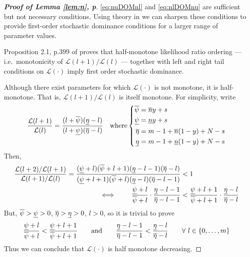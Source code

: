 \documentclass[12pt, a4paper]{elsarticle}
\begin{document}
\begin{proof}[\textbf{Proof of Lemma \ref{lem:n}, p\pageref{lem:n}}]
  \label{prf:n2}
  \eqref{eq:nuDOMnl} and \eqref{eq:nlDOMnu}
  are sufficient but not necessary conditions.  Using theory in 
  \cite{klenke2010} we can sharpen these conditions to provide
  first-order stochastic dominance conditions for a larger range of
  parameter values.
  
  Proposition 2.1, p.399 of \cite{klenke2010} proves that half-monotone
  likelihood ratio ordering --- i.e.\ monotonicity of $\mathcal{L}(l+1) / \mathcal{L}(l)$ ---
  together with left and right tail conditions on $\mathcal{L}(\cdot)$
  imply first order stochastic dominance.
  
  \medskip
  
  Although there exist parameters for which $\mathcal{L}(\cdot)$ is
  not monotone, it is half-monotone.  That is, $\mathcal{L}(l+1) / \mathcal{L}(l)$ is itself monotone.  For simplicity, write
  \begin{align*}
    \frac{\mathcal{L}(l+1)}{\mathcal{L}(l)} = \frac{(l + \overline{\psi})(\underline{\eta} - l)}{(l + \underline{\psi})(\overline{\eta} - l)}
    \quad \mbox{where} \left\{\begin{aligned}
      \overline{\psi} &= \overline{n} y + s \\
      \underline{\psi} &= \underline{n} y + s \\
      \overline{\eta} &= m - 1 + \overline{n} (1 - y) + N - s \\
      \underline{\eta} &= m - 1 + \underline{n} (1 - y) + N - s
    \end{aligned} \right.
  \end{align*}
  Then,
  \begin{align*}
    \frac{\mathcal{L}(l+2)/\mathcal{L}(l+1)}{\mathcal{L}(l+1)/\mathcal{L}(l)} =
    \frac{(\underline{\psi} + l)(\overline{\psi} + l + 1)(\underline{\eta} - l - 1)(\overline{\eta} - l)}
           {(\underline{\psi} + l + 1)(\overline{\psi} + l)(\underline{\eta} -
l)(\overline{\eta} - l - 1)}
    &< 1 \\
    \iff \qquad \frac{\underline{\psi} + l}{\overline{\psi} + l} \cdot \frac{\underline{\eta} - l - 1}{\overline{\eta} - l - 1} 
    &< \frac{\underline{\psi} + l + 1}{\overline{\psi} + l + 1} \cdot \frac{\underline{\eta} -
l}{\overline{\eta} - l}
  \end{align*}
  But, $\overline{\psi} > \underline{\psi} > 0$, $\overline{\eta} > \underline{\eta} > 0$, $l > 0$, %
  so it is trivial to prove
  \[
    \frac{\underline{\psi} + l}{\overline{\psi} + l} < \frac{\underline{\psi} + l + 1}{\overline{\psi} + l + 1} \qquad\mbox{and}\qquad \frac{\underline{\eta} - l - 1}{\overline{\eta} - l - 1} < \frac{\underline{\eta} -
l}{\overline{\eta} - l} \qquad \forall\ l \in \{0,\dots,m\}
  \]
  Thus we can conclude that $\mathcal{L}(\cdot)$ is half monotone decreasing.


\end{proof}
\end{document}
